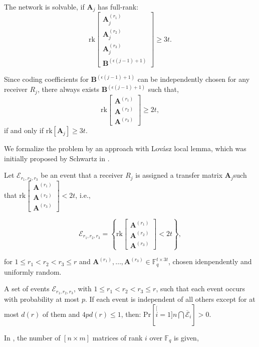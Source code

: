 The network is solvable, if $\boldsymbol{A}_{j}$ has full-rank:
\[
\mathrm{rk}\left[\begin{array}{c}
\boldsymbol{A}_{j}^{\left(r_{1}\right)}\\
\boldsymbol{A}_{j}^{\left(r_{2}\right)}\\
\boldsymbol{A}_{j}^{\left(r_{3}\right)}\\
\boldsymbol{B}^{\left(\epsilon\left(j-1\right)+1\right)}
\end{array}\right]\geq3t.
\]

Since coding coefficients for $\boldsymbol{B}^{\left(\epsilon\left(j-1\right)+1\right)}$
can be independently chosen for any receiver $R_{j}$, there always
exists $\boldsymbol{B}^{\left(\epsilon\left(j-1\right)+1\right)}$
such that,
\begin{equation}
\mathrm{rk}\left[\begin{array}{c}
\boldsymbol{A}^{\left(r_{1}\right)}\\
\boldsymbol{A}^{\left(r_{2}\right)}\\
\boldsymbol{A}^{\left(r_{3}\right)}
\end{array}\right]\geq2t,\label{eq:rk_rqm_e1l1h3s4}
\end{equation}
if and only if $\mathrm{rk}\left[\boldsymbol{A}_{j}\right]\geq3t$.

We formalize the problem by an approach with Lov\'asz local lemma,
which was initially proposed by Schwartz in \cite{MosheSchwartz:2018}.

Let $\mathcal{E}_{r_{1},r_{2},r_{3}}$ be an event that a receiver
$R_{j}$ is assigned a transfer matrix $\boldsymbol{A}_{j}$such that
$\mathrm{rk}\left[\begin{array}{c}
\boldsymbol{A}^{\left(r_{1}\right)}\\
\boldsymbol{A}^{\left(r_{2}\right)}\\
\boldsymbol{A}^{\left(r_{3}\right)}
\end{array}\right]<2t$, i.e.,

\[
\mathcal{E}_{r_{1},r_{2},r_{3}}=\left\{ \mathrm{rk}\left[\begin{array}{c}
\boldsymbol{A}^{\left(r_{1}\right)}\\
\boldsymbol{A}^{\left(r_{2}\right)}\\
\boldsymbol{A}^{\left(r_{3}\right)}
\end{array}\right]<2t\right\} ,
\]

for $1\leq r_{1}<r_{2}<r_{3}\leq r$ and $\boldsymbol{A}^{\left(r_{1}\right)},\ldots,\boldsymbol{A}^{\left(r_{3}\right)}\in\ensuremath{\mathbb{F}}_{q}^{t\times3t}$,
chosen idenpendently and uniformly random.
\begin{lem}
 A set of events $\mathcal{E}_{r_{1},r_{2},r_{3}}$, with $1\leq r_{1}<r_{2}<r_{3}\leq r$,
such that each event occurs with probability at most $p$. If each
event is independent of all others except for at most $d\left(r\right)$
of them and $4pd\left(r\right)\leq1$, then: $\mathrm{Pr}\left[\stackrel[i=1]{n}{\bigcap}\overline{\mathcal{E}}_{i}\right]>0$.
\label{thm:LLL}
\end{lem}
In \cite{Overbeck:2007}, the number of $\left[n\times m\right]$
matrices of rank $i$ over $\ensuremath{\mathbb{F}}_{q}$ is given,


